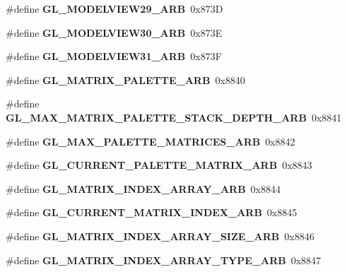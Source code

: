 \begin{DoxyCompactItemize}
\item 
\#define {\bfseries G\+L\+\_\+\+M\+O\+D\+E\+L\+V\+I\+E\+W29\+\_\+\+A\+R\+B}~0x873\+D\label{_s_d_l__opengl_8h_afd4038cab11b535dc3821001c90daf54}

\item 
\#define {\bfseries G\+L\+\_\+\+M\+O\+D\+E\+L\+V\+I\+E\+W30\+\_\+\+A\+R\+B}~0x873\+E\label{_s_d_l__opengl_8h_a94c34679eb56f659baae85a5f2367510}

\item 
\#define {\bfseries G\+L\+\_\+\+M\+O\+D\+E\+L\+V\+I\+E\+W31\+\_\+\+A\+R\+B}~0x873\+F\label{_s_d_l__opengl_8h_ac165b6ee5baea631c49d2f47f316a4dd}

\item 
\#define {\bfseries G\+L\+\_\+\+M\+A\+T\+R\+I\+X\+\_\+\+P\+A\+L\+E\+T\+T\+E\+\_\+\+A\+R\+B}~0x8840\label{_s_d_l__opengl_8h_a60f4d635bf46bc2ab0f5b38449ad0ae7}

\item 
\#define {\bfseries G\+L\+\_\+\+M\+A\+X\+\_\+\+M\+A\+T\+R\+I\+X\+\_\+\+P\+A\+L\+E\+T\+T\+E\+\_\+\+S\+T\+A\+C\+K\+\_\+\+D\+E\+P\+T\+H\+\_\+\+A\+R\+B}~0x8841\label{_s_d_l__opengl_8h_aee717060b28f0bc74f16df3a87808eec}

\item 
\#define {\bfseries G\+L\+\_\+\+M\+A\+X\+\_\+\+P\+A\+L\+E\+T\+T\+E\+\_\+\+M\+A\+T\+R\+I\+C\+E\+S\+\_\+\+A\+R\+B}~0x8842\label{_s_d_l__opengl_8h_a01282453b2e4ebcc2d8ece6a5646e319}

\item 
\#define {\bfseries G\+L\+\_\+\+C\+U\+R\+R\+E\+N\+T\+\_\+\+P\+A\+L\+E\+T\+T\+E\+\_\+\+M\+A\+T\+R\+I\+X\+\_\+\+A\+R\+B}~0x8843\label{_s_d_l__opengl_8h_af0c2db233824e47ec30dd6a11d70196e}

\item 
\#define {\bfseries G\+L\+\_\+\+M\+A\+T\+R\+I\+X\+\_\+\+I\+N\+D\+E\+X\+\_\+\+A\+R\+R\+A\+Y\+\_\+\+A\+R\+B}~0x8844\label{_s_d_l__opengl_8h_a04104b6a38584f43d25b44c13d904ff3}

\item 
\#define {\bfseries G\+L\+\_\+\+C\+U\+R\+R\+E\+N\+T\+\_\+\+M\+A\+T\+R\+I\+X\+\_\+\+I\+N\+D\+E\+X\+\_\+\+A\+R\+B}~0x8845\label{_s_d_l__opengl_8h_a18926afe8b65f8804e000c77b8cf64ec}

\item 
\#define {\bfseries G\+L\+\_\+\+M\+A\+T\+R\+I\+X\+\_\+\+I\+N\+D\+E\+X\+\_\+\+A\+R\+R\+A\+Y\+\_\+\+S\+I\+Z\+E\+\_\+\+A\+R\+B}~0x8846\label{_s_d_l__opengl_8h_ad12b0f078eed21adfbab8c9b713e6c26}

\item 
\#define {\bfseries G\+L\+\_\+\+M\+A\+T\+R\+I\+X\+\_\+\+I\+N\+D\+E\+X\+\_\+\+A\+R\+R\+A\+Y\+\_\+\+T\+Y\+P\+E\+\_\+\+A\+R\+B}~0x8847\label{_s_d_l__opengl_8h_afbaaf55136ea6bd819538c93dfac4b2b}


\end{DoxyCompactItemize}
